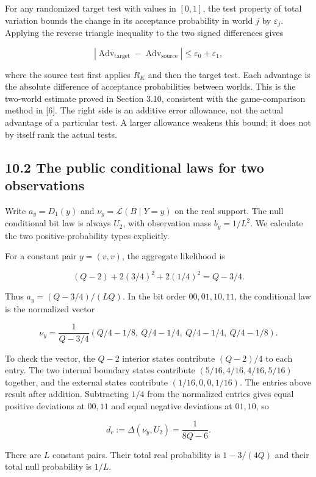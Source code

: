 \documentclass[
]{article}
\begin{document}
For any randomized target test with values in \([0,1]\), the test
property of total variation bounds the change in its acceptance
probability in world \(j\) by \(\varepsilon_j\). Applying the reverse
triangle inequality to the two signed differences gives

\[
\left|\operatorname{Adv}_{\mathrm{target}}
-\operatorname{Adv}_{\mathrm{source}}\right|
\le\varepsilon_0+\varepsilon_1,
\]

where the source test first applies \(R_K\) and then the target test.
Each advantage is the absolute difference of acceptance probabilities
between worlds. This is the two-world estimate proved in Section 3.10,
consistent with the game-comparison method in {[}6{]}. The right side is
an additive error allowance, not the actual advantage of a particular
test. A larger allowance weakens this bound; it does not by itself rank
the actual tests.

\subsection{10.2 The public conditional laws for two
observations}\label{the-public-conditional-laws-for-two-observations}

Write \(a_y=D_1(y)\) and \(\nu_y=\mathcal L(B\mid Y=y)\) on the real
support. The null conditional bit law is always \(U_2\), with
observation mass \(b_y=1/L^2\). We calculate the two
positive-probability types explicitly.

For a constant pair \(y=(v,v)\), the aggregate likelihood is

\[
(Q-2)+2(3/4)^2+2(1/4)^2=Q-3/4.
\]

Thus \(a_y=(Q-3/4)/(LQ)\). In the bit order \(00,01,10,11\), the
conditional law is the normalized vector

\[
\nu_y=\frac1{Q-3/4}
\left(Q/4-1/8,\ Q/4-1/4,\ Q/4-1/4,\ Q/4-1/8\right).
\]

To check the vector, the \(Q-2\) interior states contribute \((Q-2)/4\)
to each entry. The two internal boundary states contribute
\((5/16,4/16,4/16,5/16)\) together, and the external states contribute
\((1/16,0,0,1/16)\). The entries above result after addition.
Subtracting \(1/4\) from the normalized entries gives equal positive
deviations at \(00,11\) and equal negative deviations at \(01,10\), so

\[
d_c:=\Delta(\nu_y,U_2)=\frac1{8Q-6}.
\]

There are \(L\) constant pairs. Their total real probability is
\(1-3/(4Q)\) and their total null probability is \(1/L\).
\end{document}
